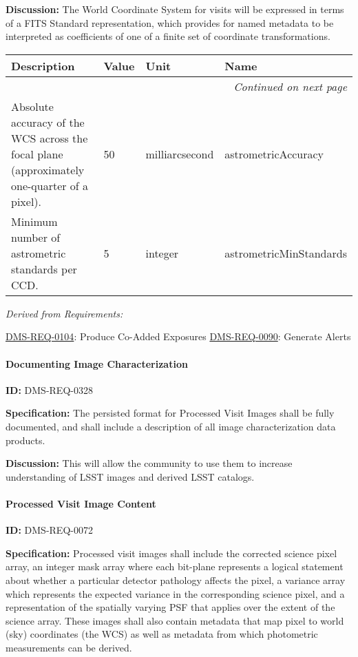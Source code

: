 \documentclass[SE,toc,lsstdraft]{lsstdoc}
\makeatletter
\newcommand{\paramname}[1]{\hspace{0pt}#1}
\newcommand{\unitname}[1]{\hspace{0pt}#1}
\newenvironment{parameters}[0]{%
\setlength\LTleft{0pt}
\setlength\LTright{\fill}
\begin{small}
\begin{longtable}[]{|p{0.5\textwidth}|l|p{0.6in}|p{1.74in}@{}|}

\hline \textbf{Description} & \textbf{Value} & \textbf{Unit} & \textbf{Name} \\ \hline
\endhead

\hline \multicolumn{4}{r}{\emph{Continued on next page}} \\
\endfoot

\hline\hline
\endlastfoot
}{%
\hline
\end{longtable}
\end{small}
}
\makeatother
\begin{document}
\textbf{Discussion:} The World Coordinate System for visits will be expressed in terms of a FITS Standard representation, which provides for named metadata to be interpreted as coefficients of one of a finite set of coordinate transformations.



\begin{parameters}
Absolute accuracy of the WCS across the focal plane (approximately one-quarter of a pixel).
&
50
&
\unitname{%
milliarcsecond
}
&
\paramname{%
astrometricAccuracy
} \\\hline
Minimum number of astrometric standards per CCD.
&
5
&
\unitname{%
integer
}
&
\paramname{%
astrometricMinStandards
} \\\hline
\end{parameters}




\emph{Derived from Requirements:}

\hyperref[DMS-REQ-0104]{DMS-REQ-0104}:
Produce Co-Added Exposures \newline
\hyperref[DMS-REQ-0090]{DMS-REQ-0090}:
Generate Alerts \newline


\paragraph{Documenting Image Characterization}\hfill  %

\label{DMS-REQ-0328}
\textbf{ID:} DMS-REQ-0328

\textbf{Specification:} The persisted format for Processed Visit Images shall be fully documented, and shall include a description of all image characterization data products.

\textbf{Discussion:} This will allow the community to use them to increase understanding of LSST images and derived LSST catalogs.




\paragraph{Processed Visit Image Content}\hfill  %

\label{DMS-REQ-0072}
\textbf{ID:} DMS-REQ-0072

\textbf{Specification:} Processed visit images shall include the corrected science pixel array, an integer mask array where each bit-plane represents a logical statement about whether a particular detector pathology affects the pixel, a variance array which represents the expected variance in the corresponding science pixel, and a representation of the spatially varying PSF that applies over the extent of the science array. These images shall also contain metadata that map pixel to world (sky) coordinates (the WCS) as well as metadata from which photometric measurements can be derived.
\end{document}
